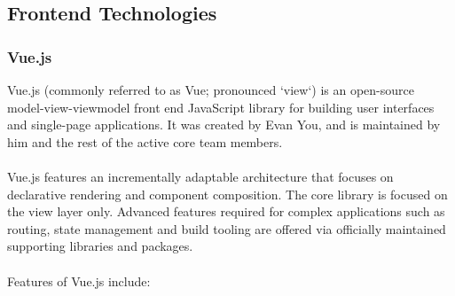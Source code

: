 \subsection{Frontend Technologies}
\subsubsection{Vue.js}
Vue.js (commonly referred to as Vue; pronounced `view`) is an open-source model-view-viewmodel front end JavaScript library for building user interfaces and single-page applications. It was created by Evan You, and is maintained by him and the rest of the active core team members.\cite{enwiki:1201106318}\\\\
Vue.js features an incrementally adaptable architecture that focuses on declarative rendering and component composition. The core library is focused on the view layer only. Advanced features required for complex applications such as routing, state management and build tooling are offered via officially maintained supporting libraries and packages.\cite{enwiki:1201106318}\\\\
Features of Vue.js include:

